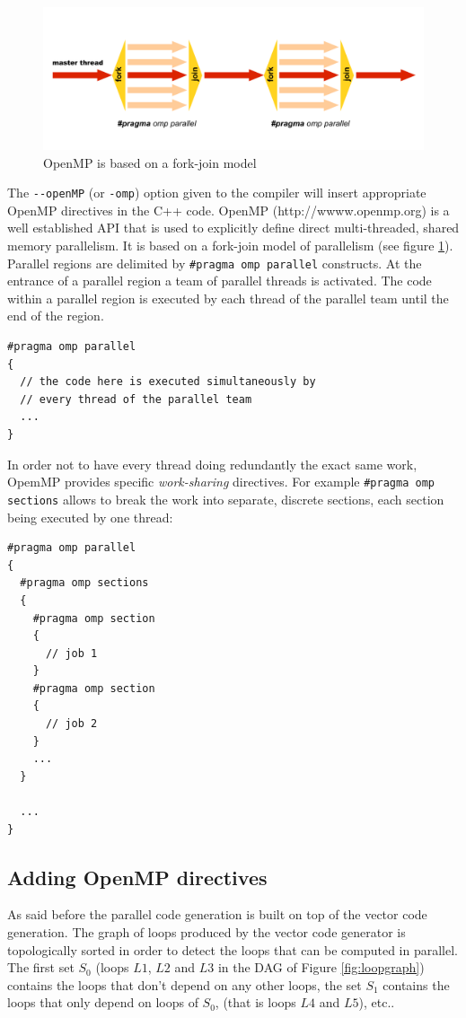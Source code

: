 \begin{figure}[htb]
  \centering
  \includegraphics[scale=0.5]{images/openmp-model}
  \caption{OpenMP is based on a fork-join model}   
  \label{fig:openmp}
\end{figure}

The \lstinline!--openMP! (or \lstinline!-omp!) option given to the \faust compiler will insert appropriate OpenMP directives in the C++ code. OpenMP (http://wwww.openmp.org) is a well established API that is used to explicitly define direct multi-threaded, shared memory parallelism. It is based on a fork-join model of parallelism (see figure \ref{fig:openmp}). 
Parallel regions are delimited by \lstinline!#pragma omp parallel! constructs. At the entrance of a parallel region a team of parallel threads is activated. The code within a parallel region is executed by each thread of the parallel team until the end of the region. 

\begin{lstlisting}
#pragma omp parallel
{
  // the code here is executed simultaneously by 
  // every thread of the parallel team
  ...
}
\end{lstlisting}

In order not to have every thread doing redundantly the exact same work, OpemMP provides specific \textit{work-sharing} directives. For example \lstinline!#pragma omp sections! allows to break the work into separate, discrete sections, each section being executed by one thread:

\begin{lstlisting}
#pragma omp parallel
{
  #pragma omp sections
  {
    #pragma omp section
    {
      // job 1
    }
    #pragma omp section
    {
      // job 2
    }
    ...
  }

  ...
}
\end{lstlisting}

\subsection{Adding OpenMP directives}
As said before the parallel code generation is built on top of the vector code generation. The graph of loops produced by the vector code generator is topologically sorted in order to detect the loops that can be computed in parallel. The first set $S_0$ (loops $L1$, $L2$ and $L3$ in the DAG of Figure \ref{fig:loopgraph}) contains the loops that don't depend on any other loops, the set $S_1$ contains the loops that only depend on loops of $S_0$, (that is loops $L4$ and $L5$), etc.. 

